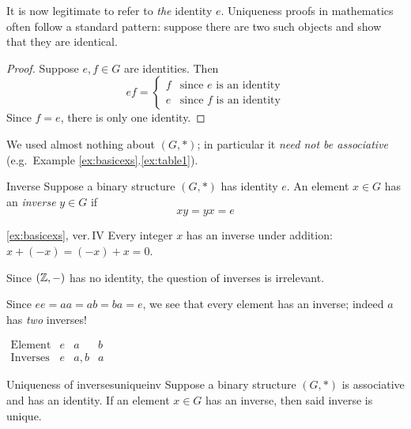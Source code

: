 It is now legitimate to refer to \emph{the} identity $e$. Uniqueness proofs in mathematics often follow a standard pattern: suppose there are two such objects and show that they are identical.

\begin{proof}
	Suppose $e,f\in G$ are identities. Then
	\[
		ef=
		\begin{cases}
			f&\text{since $e$ is an identity}\\
			e&\text{since $f$ is an identity}
		\end{cases}
	\]
	Since $f=e$, there is only one identity.
\end{proof}

We used almost nothing about $(G,*)$; in particular it \emph{need not be associative} (e.g.\ Example \ref*{ex:basicexs}.\ref{ex:table1}).

\begin{defn}{Inverse}{}
	Suppose a binary structure $(G,*)$ has identity $e$. An element $x\in G$ has an \emph{inverse} $y\in G$ if
	\[
		xy=yx=e
	\]
\end{defn}

\begin{examples*}{\ref{ex:basicexs}, ver.\,IV}{}
	\exstart Every integer $x$ has an inverse under addition: $x+(-x)=(-x)+x=0$.
	\begin{enumerate}\setcounter{enumi}{1}%
	  \item Since $(\mathbb{Z},-)$ has no identity, the question of inverses is irrelevant.
	  
	  \begin{minipage}[t]{0.7\linewidth}\vspace{-5pt}
	  	\item Since $ee=aa=ab=ba=e$, we see that every element has an inverse; indeed $a$ has \emph{two} inverses!
	  \end{minipage}
	  \hfill
	  \begin{minipage}[t]{0.29\linewidth}\vspace{-8pt}
		  \flushright
		  $\begin{array}{l||c|c|c}
		  	\text{Element}&e&a&b\\\hline
		  	\text{Inverses}&e&a,b&a
		  \end{array}$
	  \end{minipage}
	\end{enumerate}
\end{examples*}


\begin{lemm}{Uniqueness of inverses}{uniqueinv}
	Suppose a binary structure $(G,\ast)$ is associative and has an identity. If an element $x\in G$ has an inverse, then said inverse is unique.
\end{lemm}

